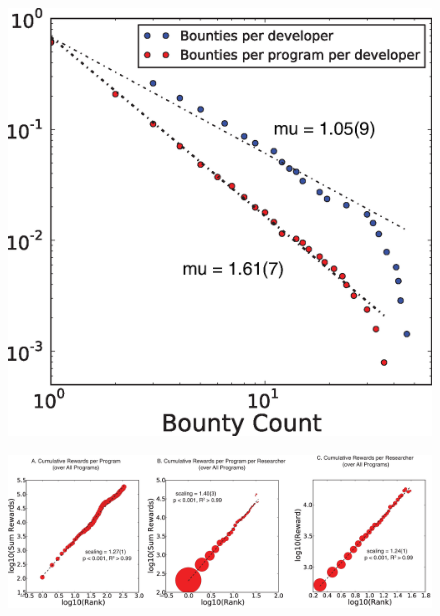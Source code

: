 \begin{figure}
\begin{center}
\includegraphics[width=12cm]{figures/CCDF_count_Bounties.eps}
\caption{}
\label{ }
\end{center}
\end{figure}


\begin{figure}
\begin{center}
\includegraphics[width=16cm]{figures/scalings.eps}
\caption{}
\label{ }
\end{center}
\end{figure}
